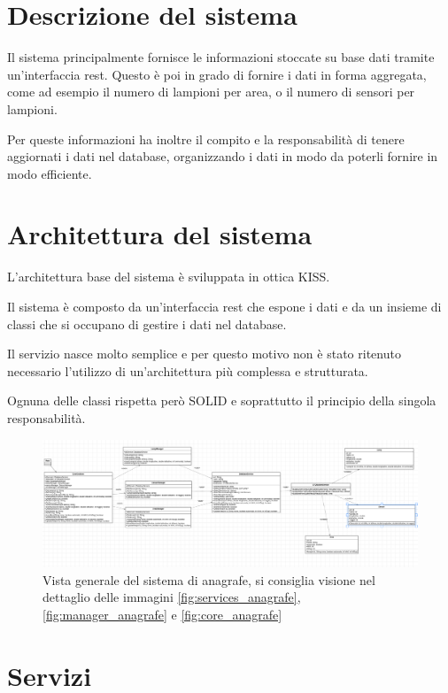 \section{Descrizione del sistema}

Il sistema principalmente fornisce le informazioni stoccate su base dati tramite un'interfaccia rest.
Questo è poi in grado di fornire i dati in forma aggregata, come ad esempio il numero di lampioni per area, o il numero di sensori per lampioni.

Per queste informazioni ha inoltre il compito e la responsabilità di tenere aggiornati i dati nel database, organizzando i dati in modo da poterli fornire in modo efficiente.

\section{Architettura del sistema}

L'architettura base del sistema è sviluppata in ottica KISS.

Il sistema è composto da un'interfaccia rest che espone i dati e da un insieme di classi che si occupano di gestire i dati nel database.

Il servizio nasce molto semplice e per questo motivo non è stato ritenuto necessario l'utilizzo di un'architettura più complessa e strutturata.

Ognuna delle classi rispetta però SOLID e soprattutto il principio della singola responsabilità.

\begin{figure}[h]
    \centering
    \includegraphics[width=\textwidth]{img/anagrafe_generale.png}
    \caption{Vista generale del sistema di anagrafe, si consiglia visione nel dettaglio delle immagini \ref{fig:services_anagrafe}, \ref{fig:manager_anagrafe} e \ref{fig:core_anagrafe}}
    \label{fig:general_anagrafe}
\end{figure}

\section{Servizi}

